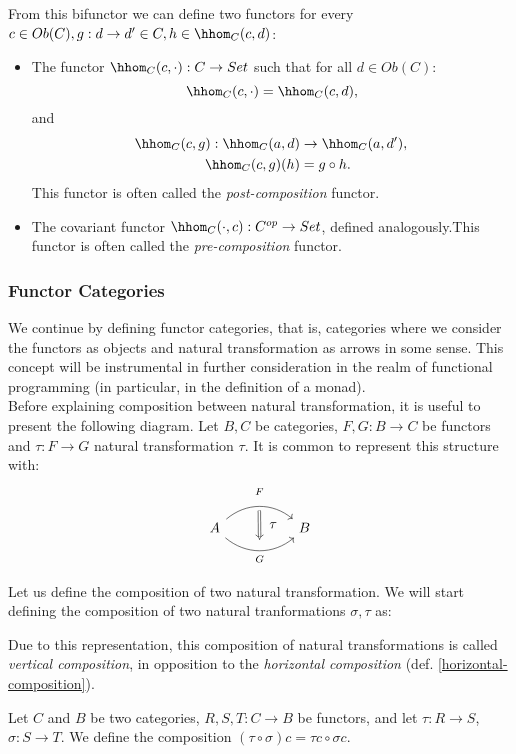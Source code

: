 From this bifunctor we can define two functors for every $c\in Ob(C),g:d\to d' \in C, h\in \hhom_C(c,d) $:
\begin{itemize}
\item  The functor $\hhom_C(c, \cdot):C\to Set$ such that for all $d \in Ob(C)$:
  \[
   \hhom_C(c,\cdot) = \hhom_C (c,d),
 \]
 and
  \begin{align*}
    \hhom_C(c,g): \hhom_C (a,d) & \to \hhom_C(a,d'),\\
    \hhom_C(c,g) (h)   &= g \circ h .
  \end{align*}
This functor is often called the \emph{post-composition} functor.
\item  The covariant functor $\hhom_C(\cdot, c):C^{op}\to Set$, defined analogously.This functor is often called the \emph{pre-composition} functor.
\end{itemize}
\subsubsection{Functor Categories}
We continue by defining functor categories, that is, categories where we consider the functors as objects and natural transformation as arrows in some sense. This concept will be instrumental in further consideration in the realm of functional programming (in particular, in the definition of a monad).\\

Before explaining composition between natural transformation, it is useful to present the following diagram. Let $B,C$ be categories, $F,G:B\to C$ be functors and $\tau:F\to G$ natural transformation $\tau$. It is common to represent this structure with:
\[
  \begin{tikzcd}[column sep=huge]
    A
    \arrow[bend left=40]{r}[name=F,label=above:$\scriptstyle F$]{}
    \arrow[bend right=40]{r}[name=G,label=below:$\scriptstyle G$]{} &
    B
    \arrow[shorten <=3pt,shorten >=3pt,Rightarrow,to path={(F) -- node[label=right:$\tau$] {} (G)}]{}
  \end{tikzcd}
\]

Let us define the composition of two natural transformation. We will start defining the composition of two natural tranformations $\sigma, \tau$ as:


Due to this representation, this composition of natural transformations is called \emph{vertical composition}, in opposition to the \emph{horizontal composition} (def. \ref{horizontal-composition}).

\begin{definition}\label{vertical-composition}
  Let $C$ and $B$ be two categories, $R,S,T : C \to B$ be functors, and let $\tau: R \to S$, $\sigma:S\to T$. We define the composition $(\tau \circ \sigma)c = \tau c\circ \sigma c$.
\end{definition}

